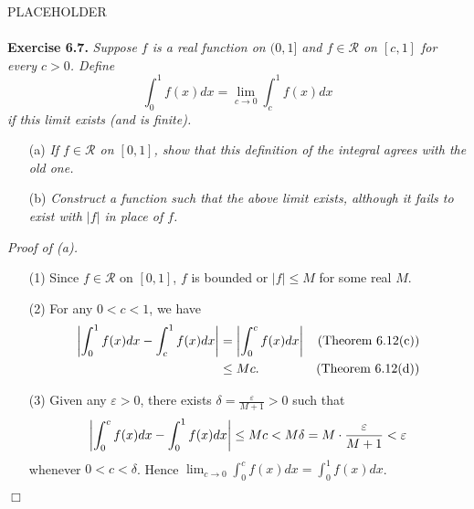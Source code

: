 \documentclass{article}
\begin{document}
PLACEHOLDER \\\\






\textbf{Exercise 6.7.}
\emph{Suppose $f$ is a real function on $(0,1]$ and $f \in \mathscr{R}$ on $[c,1]$
for every $c > 0$.
Define
\[
  \int_{0}^{1}f(x)dx = \lim_{c \to 0} \int_{c}^{1}f(x)dx
\]
if this limit exists (and is finite).}
\begin{enumerate}
  \item[(a)]
  \emph{If $f \in \mathscr{R}$ on $[0,1]$,
  show that this definition of the integral agrees with the old one.}

  \item[(b)]
  \emph{Construct a function such that the above limit exists,
  although it fails to exist with $|f|$ in place of $f$.} \\
\end{enumerate}

\emph{Proof of (a).}
\begin{enumerate}
\item[(1)]
  Since $f \in \mathscr{R}$ on $[0,1]$, $f$ is bounded or
  $|f| \leq M$ for some real $M$.

\item[(2)]
For any $0 < c < 1$,
we have
\begin{align*}
  \abs{ \int_{0}^{1} f(x)dx - \int_{c}^{1} f(x)dx }
  &= \abs{ \int_{0}^{c} f(x)dx }
    &\text{(Theorem 6.12(c))}\\
  &\leq Mc.
    &\text{(Theorem 6.12(d))}
\end{align*}

\item[(3)]
Given any $\varepsilon > 0$, there exists $\delta = \frac{\varepsilon}{M+1} > 0$
such that
\[
  \abs{ \int_{0}^{c} f(x)dx - \int_{0}^{1} f(x)dx }
  \leq Mc
  < M \delta
  = M \cdot \frac{\varepsilon}{M+1}
  < \varepsilon
\]
whenever $0 < c < \delta$.
Hence $\lim_{c \to 0} \int_{0}^{c} f(x)dx = \int_{0}^{1} f(x)dx$.
\end{enumerate}
$\Box$ \\
\end{document}
